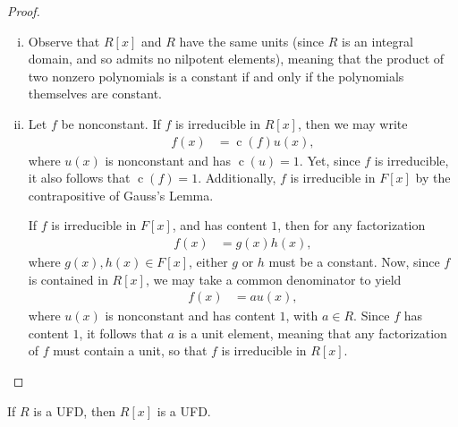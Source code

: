 \documentclass[10pt]{mypackage}
\begin{document}
\begin{proof}\hfill
  \begin{enumerate}[(i)]
    \item Observe that $R[x]$ and $R$ have the same units (since $R$ is an integral domain, and so admits no nilpotent elements), meaning that the product of two nonzero polynomials is a constant if and only if the polynomials themselves are constant.
    \item Let $f$ be nonconstant. If $f$ is irreducible in $R[x]$, then we may write
      \begin{align*}
        f(x) &= \operatorname{c}\left( f \right)u(x),
      \end{align*}
      where $u(x)$ is nonconstant and has $\operatorname{c}(u) = 1$. Yet, since $f$ is irreducible, it also follows that $\operatorname{c}(f) = 1$. Additionally, $f$ is irreducible in $F[x]$ by the contrapositive of Gauss's Lemma.%

      If $f$ is irreducible in $F[x]$, and has content $1$, then for any factorization
      \begin{align*}
        f(x) &= g(x)h(x),
      \end{align*}
      where $g(x),h(x)\in F[x]$, either $g$ or $h$ must be a constant. Now, since $f$ is contained in $R[x]$, we may take a common denominator to yield
      \begin{align*}
        f(x) &= a u(x),
      \end{align*}
      where $u(x)$ is nonconstant and has content $1$, with $a\in R$. Since $f$ has content $1$, it follows that $a$ is a unit element, meaning that any factorization of $f$ must contain a unit, so that $f$ is irreducible in $R[x]$.
  \end{enumerate}
\end{proof}
\begin{theorem}
  If $R$ is a UFD, then $R[x]$ is a UFD.
\end{theorem}
\end{document}
